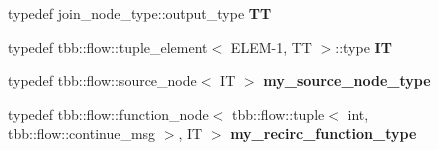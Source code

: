 \begin{DoxyCompactItemize}
\item 
\hypertarget{classsource__node__helper_a9b5578441cef2c7ce89871c0d70b1914}{}typedef join\+\_\+node\+\_\+type\+::output\+\_\+type {\bfseries T\+T}\label{classsource__node__helper_a9b5578441cef2c7ce89871c0d70b1914}

\item 
\hypertarget{classsource__node__helper_a74a5baccce23fbc0c28e0d5aa3816540}{}typedef tbb\+::flow\+::tuple\+\_\+element$<$ E\+L\+E\+M-\/1, T\+T $>$\+::type {\bfseries I\+T}\label{classsource__node__helper_a74a5baccce23fbc0c28e0d5aa3816540}

\item 
\hypertarget{classsource__node__helper_a6d10073fdfda6c2c25eccf3786aa1ee8}{}typedef tbb\+::flow\+::source\+\_\+node$<$ I\+T $>$ {\bfseries my\+\_\+source\+\_\+node\+\_\+type}\label{classsource__node__helper_a6d10073fdfda6c2c25eccf3786aa1ee8}

\item 
\hypertarget{classsource__node__helper_afb8d4f77738bb3b865e179cf195866e2}{}typedef tbb\+::flow\+::function\+\_\+node$<$ tbb\+::flow\+::tuple$<$ int, tbb\+::flow\+::continue\+\_\+msg $>$, I\+T $>$ {\bfseries my\+\_\+recirc\+\_\+function\+\_\+type}\label{classsource__node__helper_afb8d4f77738bb3b865e179cf195866e2}

\end{DoxyCompactItemize}
